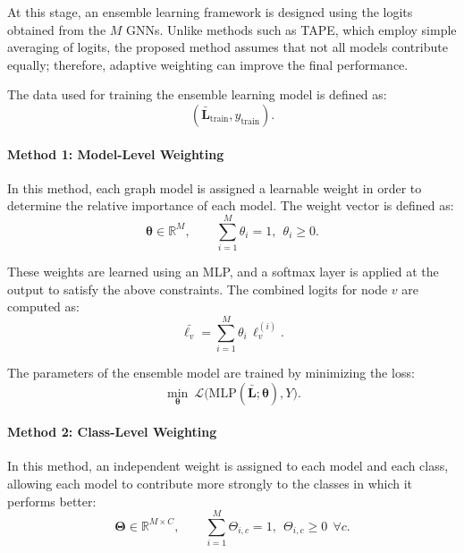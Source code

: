 \documentclass{article}
\begin{document}
At this stage, an ensemble learning framework is designed using the logits obtained from the $M$ GNNs. Unlike methods such as TAPE, which employ simple averaging of logits, the proposed method assumes that not all models contribute equally; therefore, adaptive weighting can improve the final performance.

The data used for training the ensemble learning model is defined as:
\begin{equation}
(\bar{\mathbf{L}}_{\text{train}}, y_{\text{train}}).
\end{equation}

\paragraph{Method 1: Model-Level Weighting}

In this method, each graph model is assigned a learnable weight in order to determine the relative importance of each model. The weight vector is defined as:
\begin{equation}
\boldsymbol{\theta}\in\mathbb{R}^{M}, \qquad \sum_{i=1}^{M}\theta_i=1,\ \ \theta_i\ge 0.
\end{equation}

These weights are learned using an MLP, and a softmax layer is applied at the output to satisfy the above constraints. The combined logits for node $v$ are computed as:
\begin{equation}
\bar{\boldsymbol{\ell}_{v}}=\sum_{i=1}^{M}\theta_i\,\boldsymbol{\ell}^{(i)}_{v}.
\end{equation}

The parameters of the ensemble model are trained by minimizing the loss:
\begin{equation}
\min_{\boldsymbol{\theta}}\ \mathcal{L}\big(\mathrm{MLP}(\bar{\mathbf{L}};\boldsymbol{\theta}),Y\big).
\end{equation}

\paragraph{Method 2: Class-Level Weighting}

In this method, an independent weight is assigned to each model and each class, allowing each model to contribute more strongly to the classes in which it performs better:
\begin{equation}
\mathbf{\Theta}\in\mathbb{R}^{M\times C}, \qquad
\sum_{i=1}^{M}\Theta_{i,c}=1,\ \ \Theta_{i,c}\ge 0 \ \ \forall c.
\end{equation}
\end{document}
